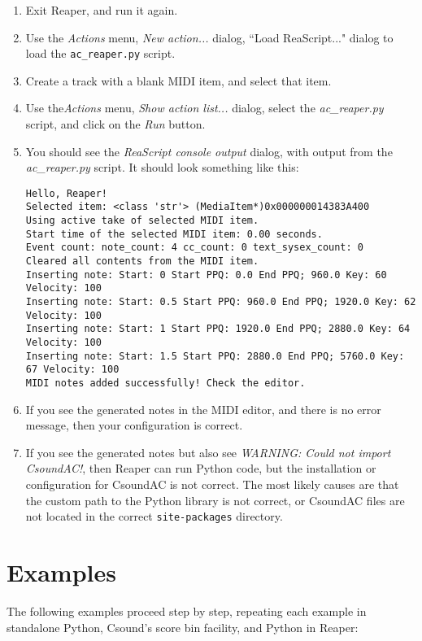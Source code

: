 \documentclass[letterpaper,10pt,DIV=12,parskip=half]{scrartcl}
\begin{document}
\begin{enumerate}
\item Exit Reaper, and run it again.
\item Use the \emph{Actions} menu, \emph{New action...} dialog, ``Load ReaScript..." dialog to load the \lstinline|ac_reaper.py| script.
\item Create a track with a blank MIDI item, and select that item.
\item Use the\emph{Actions} menu, \emph{Show action list...} dialog, select the \emph{ac\_reaper.py} script, and click on the \emph{Run} button. 
\item You should see the \emph{ReaScript console output} dialog, with output from the \emph{ac\_reaper.py} script. It should look something like this:

\begin{lstlisting}[basicstyle=\small\ttfamily]
Hello, Reaper!
Selected item: <class 'str'> (MediaItem*)0x000000014383A400
Using active take of selected MIDI item.
Start time of the selected MIDI item: 0.00 seconds.
Event count: note_count: 4 cc_count: 0 text_sysex_count: 0
Cleared all contents from the MIDI item.
Inserting note: Start: 0 Start PPQ: 0.0 End PPQ; 960.0 Key: 60 Velocity: 100
Inserting note: Start: 0.5 Start PPQ: 960.0 End PPQ; 1920.0 Key: 62 Velocity: 100
Inserting note: Start: 1 Start PPQ: 1920.0 End PPQ; 2880.0 Key: 64 Velocity: 100
Inserting note: Start: 1.5 Start PPQ: 2880.0 End PPQ; 5760.0 Key: 67 Velocity: 100
MIDI notes added successfully! Check the editor.
\end{lstlisting}
\item If you see the generated notes in the MIDI editor, and there is no error message, then your configuration is correct.
\item If you see the generated notes but also see \emph{WARNING: Could not import CsoundAC!}, then Reaper can run Python code, but the installation or configuration for CsoundAC is not correct. The most likely causes are that the custom path to the Python library is not correct, or CsoundAC files are not located in the correct \lstinline|site-packages| directory.
\end{enumerate}

\section{Examples}

The following examples proceed step by step, repeating each example in standalone Python, Csound's score bin facility, and Python in Reaper:
\end{document}
